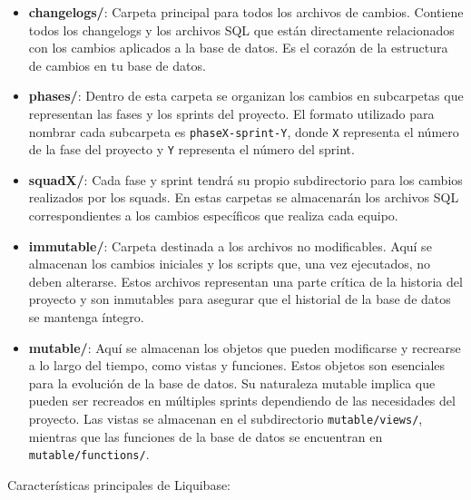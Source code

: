 \documentclass{IEEEtran}
\begin{document}
\begin{itemize}
    \item \textbf{changelogs/}: Carpeta principal para todos los archivos de cambios. Contiene todos los changelogs y los archivos SQL que están directamente relacionados con los cambios aplicados a la base de datos. Es el corazón de la estructura de cambios en tu base de datos.
    
    \item \textbf{phases/}: Dentro de esta carpeta se organizan los cambios en subcarpetas que representan las fases y los sprints del proyecto. El formato utilizado para nombrar cada subcarpeta es \texttt{phaseX-sprint-Y}, donde \texttt{X} representa el número de la fase del proyecto y \texttt{Y} representa el número del sprint.
    
    \item \textbf{squadX/}: Cada fase y sprint tendrá su propio subdirectorio para los cambios realizados por los squads. En estas carpetas se almacenarán los archivos SQL correspondientes a los cambios específicos que realiza cada equipo.
    
    \item \textbf{immutable/}: Carpeta destinada a los archivos no modificables. Aquí se almacenan los cambios iniciales y los scripts que, una vez ejecutados, no deben alterarse. Estos archivos representan una parte crítica de la historia del proyecto y son inmutables para asegurar que el historial de la base de datos se mantenga íntegro.
    
    \item \textbf{mutable/}: Aquí se almacenan los objetos que pueden modificarse y recrearse a lo largo del tiempo, como vistas y funciones. Estos objetos son esenciales para la evolución de la base de datos. Su naturaleza mutable implica que pueden ser recreados en múltiples sprints dependiendo de las necesidades del proyecto. Las vistas se almacenan en el subdirectorio \texttt{mutable/views/}, mientras que las funciones de la base de datos se encuentran en \texttt{mutable/functions/}.
\end{itemize}

Características principales de Liquibase:
\end{document}

